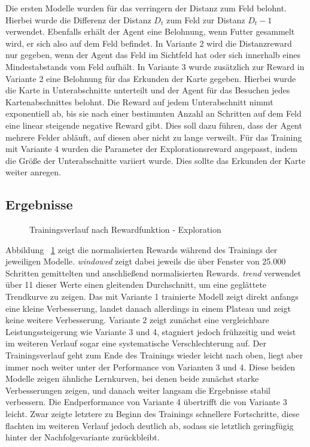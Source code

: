 Die ersten Modelle wurden für das verringern der Distanz zum Feld belohnt. Hierbei wurde die Differenz der Distanz $D_t$ zum Feld zur Distanz $D_t-1$ verwendet. Ebenfalls erhält der Agent eine Belohnung, wenn Futter gesammelt wird, er sich also auf dem Feld befindet. In Variante 2 wird die Distanzreward nur gegeben, wenn der Agent das Feld im Sichtfeld hat oder sich innerhalb eines Mindestabstands vom Feld aufhält. In Variante 3 wurde zusätzlich zur Reward in Variante 2 eine Belohnung für das Erkunden der Karte gegeben. Hierbei wurde die Karte in Unterabschnitte unterteilt und der Agent für das Besuchen jedes Kartenabschnittes belohnt. Die Reward auf jedem Unterabschnitt nimmt exponentiell ab, bis sie nach einer bestimmten Anzahl an Schritten auf dem Feld eine linear steigende negative Reward gibt. Dies soll dazu führen, dass der Agent mehrere Felder abläuft, auf diesen aber nicht zu lange verweilt. Für das Training mit Variante 4 wurden die Parameter der Explorationsreward angepasst, indem die Größe der Unterabschnitte variiert wurde. Dies sollte das Erkunden der Karte weiter anregen.

\subsection{Ergebnisse}
\begin{figure}[htbp]
  \centering
  \caption{Trainingsverlauf nach Rewardfunktion - Exploration}
  \label{fig:normalized_learning_curves_explore}
\end{figure}
Abbildung ~\ref{fig:normalized_learning_curves_explore} zeigt die normalisierten Rewards während des Trainings der jeweiligen Modelle. \emph{windowed} zeigt dabei jeweils die über Fenster von 25.000 Schritten gemittelten und anschließend normalisierten Rewards. \emph{trend} verwendet über 11 dieser Werte einen gleitenden Durchschnitt, um eine geglättete Trendkurve zu zeigen. Das mit Variante 1 trainierte Modell zeigt direkt anfangs eine kleine Verbesserung, landet danach allerdings in einem Plateau und zeigt keine weitere Verbesserung. Variante 2 zeigt zunächst eine vergleichbare Leistungssteigerung wie Variante 3 und 4, stagniert jedoch frühzeitig und weist im weiteren Verlauf sogar eine systematische Verschlechterung auf. Der Trainingsverlauf geht zum Ende des Trainings wieder leicht nach oben, liegt aber immer noch weiter unter der Performance von Varianten 3 und 4. Diese beiden Modelle zeigen ähnliche Lernkurven, bei denen beide zunächst starke Verbesserungen zeigen, und danach weiter langsam die Ergebnisse stabil verbessern. Die Endperformance von Variante 4 übertrifft die von Variante 3 leicht. Zwar zeigte letztere zu Beginn des Trainings schnellere Fortschritte, diese flachten im weiteren Verlauf jedoch deutlich ab, sodass sie letztlich geringfügig hinter der Nachfolgevariante zurückbleibt.

